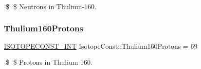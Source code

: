 \$ \$ Neutrons in Thulium-\/160. \mbox{\label{group___isotope_const-_thulium-_tm160_ga376cfc438b9160185d3c3c15ec7c526d}} 
\subsubsection{\texorpdfstring{Thulium160\+Protons}{Thulium160Protons}}
{\footnotesize\ttfamily \mbox{\hyperlink{group___isotope_const-_macros_ga5f18360b3e99483a35c32d789e62621c}{I\+S\+O\+T\+O\+P\+E\+C\+O\+N\+S\+T\+\_\+\+I\+NT}} Isotope\+Const\+::\+Thulium160\+Protons = 69}

\$ \$ Protons in Thulium-\/160. 